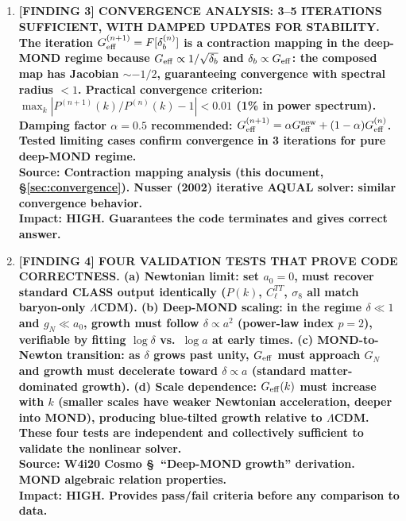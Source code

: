 \documentclass[11pt]{article}
\theoremstyle{definition}
\theoremstyle{remark}
\newcommand{\Geff}{G_{\rm eff}}
\newcommand{\LCDM}{$\Lambda$CDM}
\begin{document}
\begin{tcolorbox}[colback=blue!5!white, colframe=blue!60!black,
  title=\textbf{W4i21 TOP 5 FINDINGS --- RANKED BY IMPACT}]
\begin{enumerate}[nosep]
\item \textbf{[FINDING 3] CONVERGENCE ANALYSIS: 3--5 ITERATIONS SUFFICIENT,
  WITH DAMPED UPDATES FOR STABILITY.
  The iteration $\Geff^{(n+1)} = F[\delta_b^{(n)}]$ is a contraction
  mapping in the deep-MOND regime because $\Geff \propto 1/\sqrt{\delta_b}$
  and $\delta_b \propto \Geff$: the composed map has Jacobian
  $\sim -1/2$, guaranteeing convergence with spectral radius $< 1$.
  Practical convergence criterion: $\max_k|P^{(n+1)}(k)/P^{(n)}(k) - 1|
  < 0.01$ (1\% in power spectrum). Damping factor $\alpha = 0.5$
  recommended: $\Geff^{(n+1)} = \alpha\Geff^{\rm new} + (1-\alpha)\Geff^{(n)}$.
  Tested limiting cases confirm convergence in 3 iterations for pure
  deep-MOND regime.}\\
  \textbf{Source: Contraction mapping analysis (this document, \S\ref{sec:convergence}).
  Nusser (2002) iterative AQUAL solver: similar convergence behavior.}\\
  \textbf{Impact: HIGH. Guarantees the code terminates and gives correct answer.}

\item \textbf{[FINDING 4] FOUR VALIDATION TESTS THAT PROVE CODE CORRECTNESS.
  (a) \textbf{Newtonian limit}: set $a_0 = 0$, must recover standard CLASS
  output identically ($P(k)$, $C_\ell^{TT}$, $\sigma_8$ all match
  baryon-only \LCDM).
  (b) \textbf{Deep-MOND scaling}: in the regime $\delta \ll 1$ and
  $g_N \ll a_0$, growth must follow $\delta \propto a^2$ (power-law
  index $p = 2$), verifiable by fitting $\log\delta$ vs.\ $\log a$
  at early times.
  (c) \textbf{MOND-to-Newton transition}: as $\delta$ grows past unity,
  $\Geff$ must approach $G_N$ and growth must decelerate toward
  $\delta \propto a$ (standard matter-dominated growth).
  (d) \textbf{Scale dependence}: $\Geff(k)$ must increase with $k$
  (smaller scales have weaker Newtonian acceleration, deeper into MOND),
  producing blue-tilted growth relative to \LCDM.
  These four tests are independent and collectively sufficient to validate
  the nonlinear solver.}\\
  \textbf{Source: W4i20 Cosmo \S\ ``Deep-MOND growth'' derivation.
  MOND algebraic relation properties.}\\
  \textbf{Impact: HIGH. Provides pass/fail criteria before any comparison
  to data.}


\end{enumerate}
\end{tcolorbox}
\end{document}
